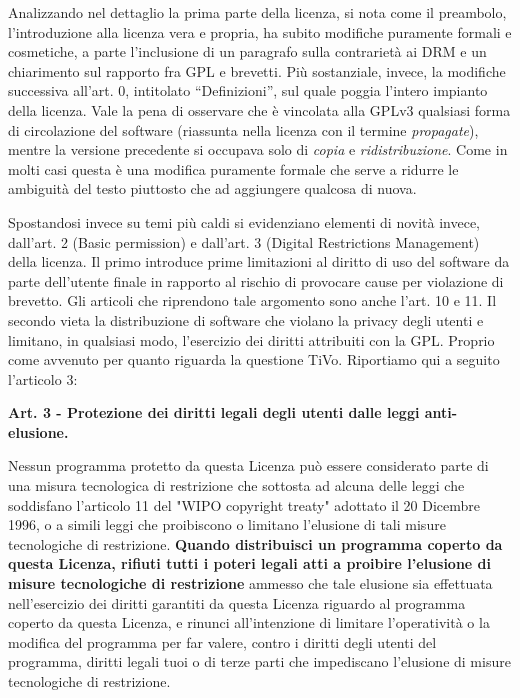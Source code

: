 Analizzando nel dettaglio la prima parte della licenza, si nota come il preambolo, l’introduzione alla licenza vera e propria, ha subito modifiche puramente formali e cosmetiche, a parte l’inclusione di un paragrafo sulla contrarietà ai DRM e un chiarimento sul rapporto fra GPL e brevetti.
Più sostanziale, invece, la modifiche successiva all'art. 0, intitolato “Definizioni”, sul quale poggia l’intero impianto della licenza. Vale la pena di osservare che è vincolata alla GPLv3 qualsiasi forma di circolazione del software (riassunta nella licenza con il termine \textit{propagate}), mentre la versione precedente si occupava solo di \textit{copia} e \textit{ridistribuzione}. Come in molti casi questa è una modifica puramente formale che serve a ridurre le ambiguità del testo piuttosto che ad aggiungere qualcosa di nuova.

Spostandosi invece su temi più caldi si evidenziano elementi di novità invece, dall’art. 2 (Basic permission) e dall’art. 3 (Digital Restrictions Management) della licenza.
Il primo introduce prime limitazioni al diritto di uso del software da parte dell’utente finale in rapporto al rischio di provocare cause per violazione di brevetto. Gli articoli che riprendono tale argomento sono anche l'art. 10 e 11.
Il secondo vieta la distribuzione di software che violano la privacy degli utenti e limitano, in qualsiasi modo, l’esercizio dei diritti attribuiti con la GPL. Proprio come avvenuto per quanto riguarda la questione TiVo.
Riportiamo qui a seguito l'articolo 3:\\


\begin{scriptsize}

\textbf{Art. 3 - Protezione dei diritti legali degli utenti dalle leggi anti-elusione.}

Nessun programma protetto da questa Licenza può essere considerato parte di una misura tecnologica di restrizione che sottosta ad alcuna delle leggi che soddisfano l'articolo 11 del "WIPO copyright treaty" adottato il 20 Dicembre 1996, o a simili leggi che proibiscono o limitano l'elusione di tali misure tecnologiche di restrizione.
\textbf{Quando distribuisci un programma coperto da questa Licenza, rifiuti tutti i poteri legali atti a proibire l'elusione di misure tecnologiche di restrizione} ammesso che tale elusione sia effettuata nell'esercizio dei diritti garantiti da questa Licenza riguardo al programma coperto da questa Licenza, e rinunci all'intenzione di limitare l'operatività o la modifica del programma per far valere, contro i diritti degli utenti del programma, diritti legali tuoi o di terze parti che impediscano l'elusione di misure tecnologiche di restrizione.\\
\end{scriptsize}


